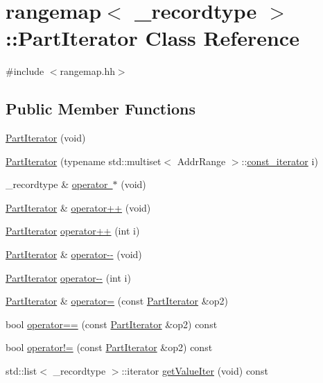 \hypertarget{classrangemap_1_1_part_iterator}{}\section{rangemap$<$ \+\_\+recordtype $>$\+::Part\+Iterator Class Reference}
\label{classrangemap_1_1_part_iterator}


{\ttfamily \#include $<$rangemap.\+hh$>$}

\subsection*{Public Member Functions}
\begin{DoxyCompactItemize}
\item 
\mbox{\hyperlink{classrangemap_1_1_part_iterator_ad9efce16ee103789652c74a5b102e33b}{Part\+Iterator}} (void)
\item 
\mbox{\hyperlink{classrangemap_1_1_part_iterator_a62e75c137f238fc316ae0467094058f8}{Part\+Iterator}} (typename std\+::multiset$<$ Addr\+Range $>$\+::\mbox{\hyperlink{classrangemap_affa7462e68d053d3a066fe0b8d46a99d}{const\+\_\+iterator}} i)
\item 
\+\_\+recordtype \& \mbox{\hyperlink{classrangemap_1_1_part_iterator_ac8703a032ed96dc402c04855030a962d}{operator $\ast$}} (void)
\item 
\mbox{\hyperlink{classrangemap_1_1_part_iterator}{Part\+Iterator}} \& \mbox{\hyperlink{classrangemap_1_1_part_iterator_a129ddc82acbb0258d2077d9a24358097}{operator++}} (void)
\item 
\mbox{\hyperlink{classrangemap_1_1_part_iterator}{Part\+Iterator}} \mbox{\hyperlink{classrangemap_1_1_part_iterator_a944ca3214a932c15c3ff0f5cd457d517}{operator++}} (int i)
\item 
\mbox{\hyperlink{classrangemap_1_1_part_iterator}{Part\+Iterator}} \& \mbox{\hyperlink{classrangemap_1_1_part_iterator_ab3a419addb975d6f0c88ed3c580d9e24}{operator-\/-\/}} (void)
\item 
\mbox{\hyperlink{classrangemap_1_1_part_iterator}{Part\+Iterator}} \mbox{\hyperlink{classrangemap_1_1_part_iterator_a5f7ba5fc91566b229613b6e0fd93a3a7}{operator-\/-\/}} (int i)
\item 
\mbox{\hyperlink{classrangemap_1_1_part_iterator}{Part\+Iterator}} \& \mbox{\hyperlink{classrangemap_1_1_part_iterator_a980901e94694562b197f98ea33f77f00}{operator=}} (const \mbox{\hyperlink{classrangemap_1_1_part_iterator}{Part\+Iterator}} \&op2)
\item 
bool \mbox{\hyperlink{classrangemap_1_1_part_iterator_a9dfa0ccb8f54931b5247704649808413}{operator==}} (const \mbox{\hyperlink{classrangemap_1_1_part_iterator}{Part\+Iterator}} \&op2) const
\item 
bool \mbox{\hyperlink{classrangemap_1_1_part_iterator_a23173a96defe433e76badccdc2f964d7}{operator!=}} (const \mbox{\hyperlink{classrangemap_1_1_part_iterator}{Part\+Iterator}} \&op2) const
\item 
std\+::list$<$ \+\_\+recordtype $>$\+::iterator \mbox{\hyperlink{classrangemap_1_1_part_iterator_a6f2bffc8d4de87e88cc9a613f8ee1203}{get\+Value\+Iter}} (void) const
\end{DoxyCompactItemize}


